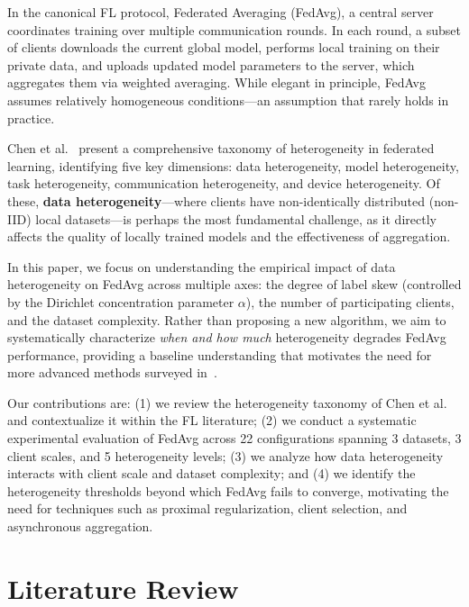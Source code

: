 \documentclass[journal]{IEEEtran}
\begin{document}
In the canonical FL protocol, Federated Averaging (FedAvg), a central server coordinates training over multiple communication rounds. In each round, a subset of clients downloads the current global model, performs local training on their private data, and uploads updated model parameters to the server, which aggregates them via weighted averaging. While elegant in principle, FedAvg assumes relatively homogeneous conditions---an assumption that rarely holds in practice.

Chen et al.~\cite{chen2025advances} present a comprehensive taxonomy of heterogeneity in federated learning, identifying five key dimensions: data heterogeneity, model heterogeneity, task heterogeneity, communication heterogeneity, and device heterogeneity. Of these, \textbf{data heterogeneity}---where clients have non-identically distributed (non-IID) local datasets---is perhaps the most fundamental challenge, as it directly affects the quality of locally trained models and the effectiveness of aggregation.

In this paper, we focus on understanding the empirical impact of data heterogeneity on FedAvg across multiple axes: the degree of label skew (controlled by the Dirichlet concentration parameter $\alpha$), the number of participating clients, and the dataset complexity. Rather than proposing a new algorithm, we aim to systematically characterize \textit{when and how much} heterogeneity degrades FedAvg performance, providing a baseline understanding that motivates the need for more advanced methods surveyed in~\cite{chen2025advances}.

Our contributions are: (1) we review the heterogeneity taxonomy of Chen et al.~\cite{chen2025advances} and contextualize it within the FL literature; (2) we conduct a systematic experimental evaluation of FedAvg across 22 configurations spanning 3 datasets, 3 client scales, and 5 heterogeneity levels; (3) we analyze how data heterogeneity interacts with client scale and dataset complexity; and (4) we identify the heterogeneity thresholds beyond which FedAvg fails to converge, motivating the need for techniques such as proximal regularization, client selection, and asynchronous aggregation.


\section{Literature Review}
\label{sec:litreview}
\end{document}
